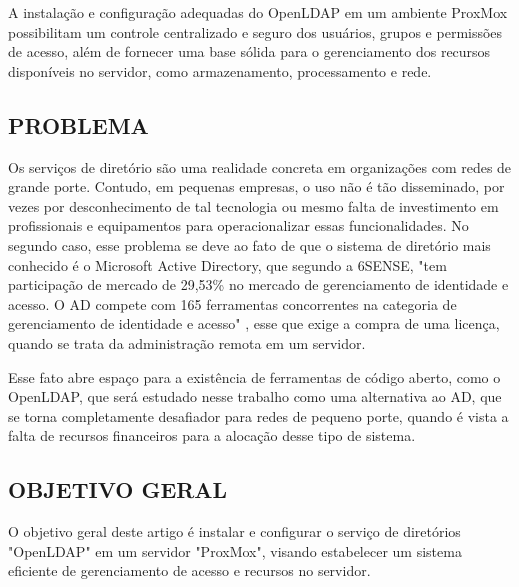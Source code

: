 A instalação e configuração adequadas do OpenLDAP em um ambiente ProxMox possibilitam um controle centralizado e seguro dos usuários, grupos e permissões de acesso, além de fornecer uma base sólida para o gerenciamento dos recursos disponíveis no servidor, como armazenamento, processamento e rede.


\subsection{PROBLEMA}
\label{subsec:problema}
Os serviços de diretório são uma realidade concreta em organizações com redes de grande porte. Contudo, em pequenas empresas, o uso não é tão disseminado, por vezes por desconhecimento de tal tecnologia ou mesmo falta de investimento em profissionais e equipamentos para operacionalizar essas funcionalidades. No segundo caso, esse problema se deve ao fato de que o sistema de diretório mais conhecido é o Microsoft Active Directory, que segundo a 6SENSE, "tem participação de mercado de 29,53\% no mercado de gerenciamento de identidade e acesso. O AD compete com 165 ferramentas concorrentes na categoria de gerenciamento de identidade e acesso" \cite{6sense}, esse que exige a compra de uma licença, quando se trata da administração remota em um servidor.

Esse fato abre espaço para a existência de ferramentas de código aberto, como o OpenLDAP, que será estudado nesse trabalho como uma alternativa ao AD, que se torna completamente desafiador para redes de pequeno porte, quando é vista a falta de recursos financeiros para a alocação desse tipo de sistema.


\subsection{OBJETIVO GERAL}
\label{subsec:objetivo-geral}
O objetivo geral deste artigo é instalar e configurar o serviço de diretórios "OpenLDAP" em um servidor "ProxMox", visando estabelecer um sistema eficiente de gerenciamento de acesso e recursos no servidor.

